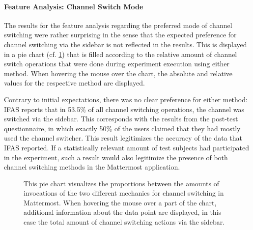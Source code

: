 \FloatBarrier

\paragraph{Feature Analysis: Channel Switch Mode} 

The results for the feature analysis regarding the preferred mode of channel switching were rather surprising in the sense that the expected preference for channel switching via the sidebar is not reflected in the results.
This is displayed in a pie chart (cf. \cref{figure:evaluation:user:visualization-feature-analysis}) that is filled according to the relative amount of channel switch operations that were done during experiment execution using either method.
When hovering the mouse over the chart, the absolute and relative values for the respective method are displayed.

Contrary to initial expectations, there was no clear preference for either method: \ac{IFAS} reports that in 53.5\% of all channel switching operations, the channel was switched via the sidebar.
This corresponds with the results from the post-test questionnaire, in which exactly 50\% of the users claimed that they had mostly used the channel switcher.
This result legitimizes the accuracy of the data that \ac{IFAS} reported.
If a statistically relevant amount of test subjects had participated in the experiment, such a result would also legitimize the presence of both channel switching methods in the Mattermost application.

\begin{figure}[t]
        \caption[Pie chart visualizing the proportions between channel switching actions.]{
        This pie chart visualizes the proportions between the amounts of invocations of the two different mechanics for channel switching in Mattermost.
        When hovering the mouse over a part of the chart, additional information about the data point are displayed, in this case the total amount of channel switching actions via the sidebar.}
        \label{figure:evaluation:user:visualization-feature-analysis}
\end{figure}

